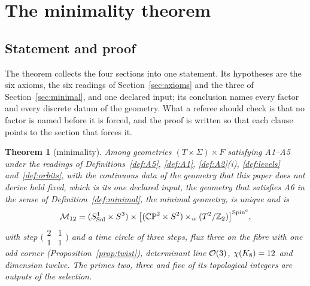 \documentclass[11pt,a4paper]{article}
\theoremstyle{plain}
\newtheorem{theorem}{Theorem}[section]
\theoremstyle{definition}
\theoremstyle{remark}
\newcommand{\Sol}{\mathrm{Sol}}
\begin{document}
\section{The minimality theorem}\label{sec:theorem}

\subsection{Statement and proof}

The theorem collects the four sections into one statement. Its hypotheses are the six axioms, the six readings of Section~\ref{sec:axioms} and the three of Section~\ref{sec:minimal}, and one declared input; its conclusion names every factor and every discrete datum of the geometry. What a referee should check is that no factor is named before it is forced, and the proof is written so that each clause points to the section that forces it.

\begin{theorem}[minimality]\label{thm:main}
Among geometries $(T\times\Sigma)\times F$ satisfying A1--A5 under the readings of Definitions~\ref{def:A5}, \ref{def:A1}, \ref{def:A2}(i), \ref{def:levels} and~\ref{def:orbits}, with the continuous data of the geometry that this paper does not derive held fixed, which is its one declared input, the geometry that satisfies A6 in the sense of Definition~\ref{def:minimal}, the minimal geometry, is unique and is
\[
\Mtwelve=(S^{1}_{\Sol}\times S^{3})\times\bigl[(\CPtwo\times\Stwo)\times_{w}(\Ttwo/\Ztwo)\bigr]^{\Spinc},
\]
with step $\bigl(\begin{smallmatrix}2&1\\1&1\end{smallmatrix}\bigr)$ and a time circle of three steps, flux three on the fibre with one odd corner (Proposition~\ref{prop:twist}), determinant line $\mathcal{O}(3)$, $\chi(K_8)=12$ and dimension twelve. The primes two, three and five of its topological integers are outputs of the selection.
\end{theorem}
\end{document}
